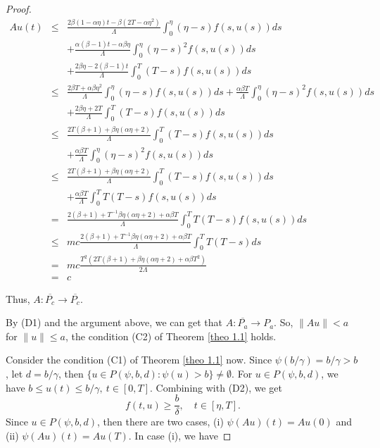 \documentclass[reqno]{amsart}\usepackage{amsmath}
\begin{document}
\begin{proof}
\begin{eqnarray*}
Au(t)&\leq&\frac{2\beta (1-\alpha \eta
)t-\beta (2T-\alpha \eta ^{2})}{\Lambda}\int_{0}^{\eta }(\eta -s)f(s, u(s))ds \\
&&+\frac{\alpha (\beta -1)t-\alpha \beta \eta}{\Lambda}\int_{0}^{\eta }(\eta -s)^{2}f(s, u(s))ds \\
&&+\frac{2\beta \eta-2(\beta-1)t }{\Lambda}\int_{0}^{T}(T-s)f(s, u(s))ds \\
&\leq&\frac{2\beta T+\alpha\beta \eta ^{2}}{\Lambda}\int_{0}^{\eta }(\eta -s)f(s, u(s))ds +\frac{\alpha\beta T}{\Lambda}\int_{0}^{\eta }(\eta -s)^{2}f(s, u(s))ds \\
&&+\frac{2\beta \eta+2T}{\Lambda}\int_{0}^{T}(T-s)f(s, u(s))ds \\
&\leq&\frac{2T(\beta+1)+\beta\eta(\alpha\eta+2)}{\Lambda}
\int_{0}^{T}(T-s)f(s, u(s))ds \\
&&+\frac{\alpha\beta T}{\Lambda}\int_{0}^{\eta}(\eta -s)^{2}f(s, u(s))ds \\
&\leq&\frac{2T(\beta+1)+\beta\eta(\alpha\eta+2)}{\Lambda}
\int_{0}^{T}(T-s)f(s, u(s))ds \\
&&+\frac{\alpha\beta T}{\Lambda}\int_{0}^{T}T(T-s)f(s, u(s))ds \\
&=&\frac{2(\beta+1)+T^{-1}\beta\eta(\alpha\eta+2)+\alpha\beta
T}{\Lambda}\int_{0}^{T}T(T-s)f(s, u(s))ds \\
&\leq& mc \frac{2(\beta+1)+T^{-1}\beta\eta(\alpha\eta+2)+\alpha\beta
T}{\Lambda}\int_{0}^{T}T(T-s)ds\\
&=& mc \frac{T^{2}(2T(\beta+1)+\beta\eta(\alpha
\eta+2)+\alpha\beta T^{2})}{2\Lambda}\\
&=& c
\end{eqnarray*}

Thus, $A:\overline {P_c}\to \overline {P_c}$.

By {\rm (D1)} and the argument above, we can get that
$A:\overline{P_a}\to P_a$. So, $\|Au\|<a$ for $\|u\|\le a$, the condition {\rm (C2)}
of Theorem \ref{theo 1.1} holds.

Consider the condition {\rm (C1)} of Theorem \ref{theo 1.1} now. Since
$\psi(b/\gamma)=b/\gamma>b$, let $d=b/\gamma$, then $\{u\in
P(\psi, b, d):\psi(u)>b\}\neq\emptyset$. For $u\in
P(\psi, b, d)$, we have $b\le u(t)\le b/\gamma,\ t\in[0, T]$.
Combining with {\rm (D2)}, we get
$$
f(t, u)\ge\frac b\delta,\quad t\in[\eta, T].
$$
Since $u\in P(\psi, b, d)$, then there are two cases, (i) $\psi(Au)(t)=Au(0)$ and (ii) $\psi(Au)(t)=Au(T)$.
In case (i), we have



\end{proof}
\end{document}
